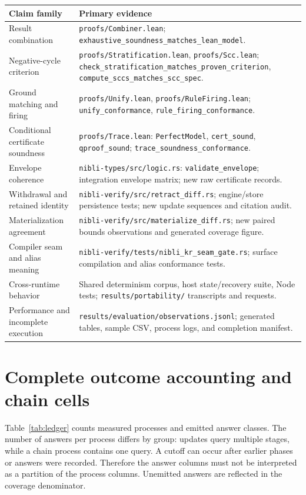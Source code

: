 \begin{longtable}{p{4.3cm}p{10.4cm}}
\toprule
Claim family & Primary evidence \\
\midrule
\endhead
Result combination &
\texttt{proofs/Combiner.lean}; \nolinkurl{exhaustive_soundness_matches_lean_model}. \\
Negative-cycle criterion &
\texttt{proofs/Stratification.lean}, \texttt{proofs/Scc.lean};
\texttt{check\_stratification\_matches\_proven\_criterion},
\texttt{compute\_sccs\_matches\_scc\_spec}. \\
Ground matching and firing &
\texttt{proofs/Unify.lean}, \texttt{proofs/RuleFiring.lean};
\texttt{unify\_conformance}, \texttt{rule\_firing\_conformance}. \\
Conditional certificate soundness &
\texttt{proofs/Trace.lean}: \texttt{PerfectModel},
\texttt{cert\_sound}, \texttt{qproof\_sound};
\texttt{trace\_soundness\_conformance}. \\
Envelope coherence &
\texttt{nibli-types/src/logic.rs}: \texttt{validate\_envelope};
integration envelope matrix; new raw certificate records. \\
Withdrawal and retained identity &
\texttt{nibli-verify/src/retract\_diff.rs}; engine/store persistence tests;
new update sequences and citation audit. \\
Materialization agreement &
\texttt{nibli-verify/src/materialize\_diff.rs};
new paired bounds observations and generated coverage figure. \\
Compiler seam and alias meaning &
\texttt{nibli-verify/tests/nibli\_kr\_seam\_gate.rs};
surface compilation and alias conformance tests. \\
Cross-runtime behavior &
Shared determinism corpus, host state/recovery suite, Node tests;
\texttt{results/portability/} transcripts and requests. \\
Performance and incomplete execution &
\texttt{results/evaluation/observations.jsonl};
generated tables, sample CSV, process logs, and completion manifest. \\
\bottomrule
\end{longtable}

\section{Complete outcome accounting and chain cells}
\label{app:outcomes}

Table~\ref{tab:ledger} counts measured processes and emitted answer classes.
The number of answers per process differs by group: updates query multiple
stages, while a chain process contains one query. A cutoff can occur after
earlier phases or answers were recorded. Therefore the answer columns must
not be interpreted as a partition of the process columns. Unemitted answers
are reflected in the coverage denominator.

